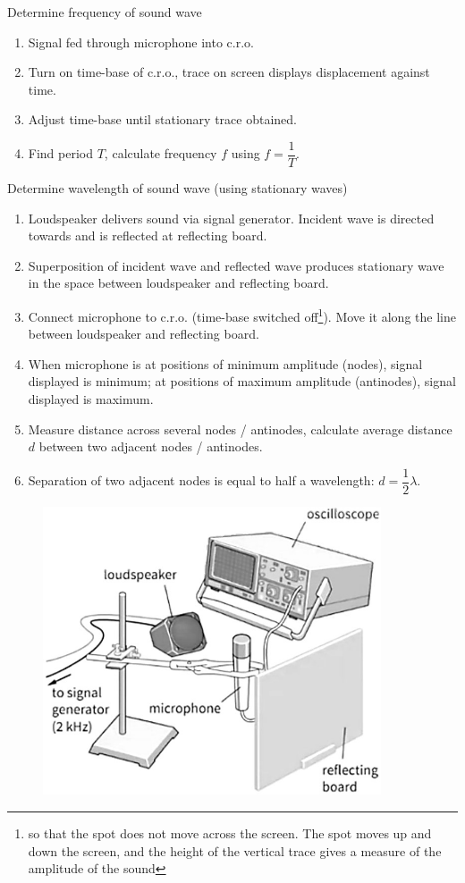 Determine frequency of sound wave
\begin{enumerate}
\item Signal fed through microphone into c.r.o.
\item Turn on time-base of c.r.o., trace on screen displays displacement against time.
\item Adjust time-base until stationary trace obtained.
\item Find period $T$, calculate frequency $f$ using $f=\dfrac{1}{T}$.
\end{enumerate}

Determine wavelength of sound wave (using stationary waves)
\begin{enumerate}
\item Loudspeaker delivers sound via signal generator. Incident wave is directed towards and is reflected at reflecting board.
\item Superposition of incident wave and reflected wave produces stationary wave in the space between loudspeaker and reflecting board.
\item Connect microphone to c.r.o. (time-base switched off\footnote{so that the spot does not move across the screen. The spot moves up and down the screen, and the height of the vertical trace gives a measure of the amplitude of the sound}). Move it along the line between loudspeaker and reflecting board.
\item When microphone is at positions of minimum amplitude (nodes), signal displayed is minimum; at positions of maximum amplitude (antinodes), signal displayed is maximum.
\item Measure distance across several nodes / antinodes, calculate average distance $d$ between two adjacent nodes / antinodes.
\item Separation of two adjacent nodes is equal to half a wavelength: $d=\dfrac{1}{2}\lambda$.
\end{enumerate}

\begin{figure}[H]
    \centering
    \includegraphics[width=10cm]{images/cro_wavelength.jpg}
\end{figure}

